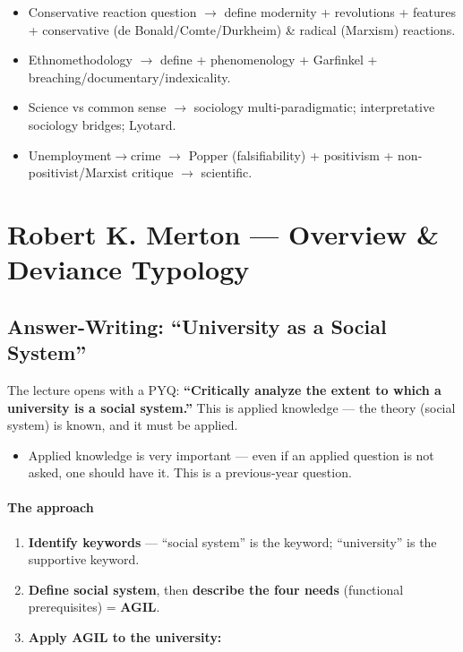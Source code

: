 \begin{QuickRevision}
\begin{itemize}
\item Conservative reaction question $\rightarrow$ define modernity + revolutions + features + conservative (de Bonald/Comte/Durkheim) \& radical (Marxism) reactions.
\item Ethnomethodology $\rightarrow$ define + phenomenology + Garfinkel + breaching/documentary/indexicality.
\item Science vs common sense $\rightarrow$ sociology multi-paradigmatic; interpretative sociology bridges; Lyotard.
\item Unemployment$\rightarrow$crime $\rightarrow$ Popper (falsifiability) + positivism + non-positivist/Marxist critique $\rightarrow$ scientific.
\end{itemize}
\end{QuickRevision}

\sectiondivider

\section{Robert K. Merton --- Overview \& Deviance Typology}

\subsection{Answer-Writing: ``University as a Social System''}

The lecture opens with a PYQ: \textbf{``Critically analyze the extent to which a university is a social system.''} This is applied knowledge --- the theory (social system) is known, and it must be applied.

\begin{PYQLink}
\begin{itemize}
\item Applied knowledge is very important --- even if an applied question is not asked, one should have it. This is a previous-year question.
\end{itemize}
\end{PYQLink}

\paragraph{The approach}
\begin{enumerate}
\item \textbf{Identify keywords} --- ``social system'' is the keyword; ``university'' is the supportive keyword.
\item \textbf{Define social system}, then \textbf{describe the four needs} (functional prerequisites) = \textbf{AGIL}.
\item \textbf{Apply AGIL to the university:}
\end{enumerate}

